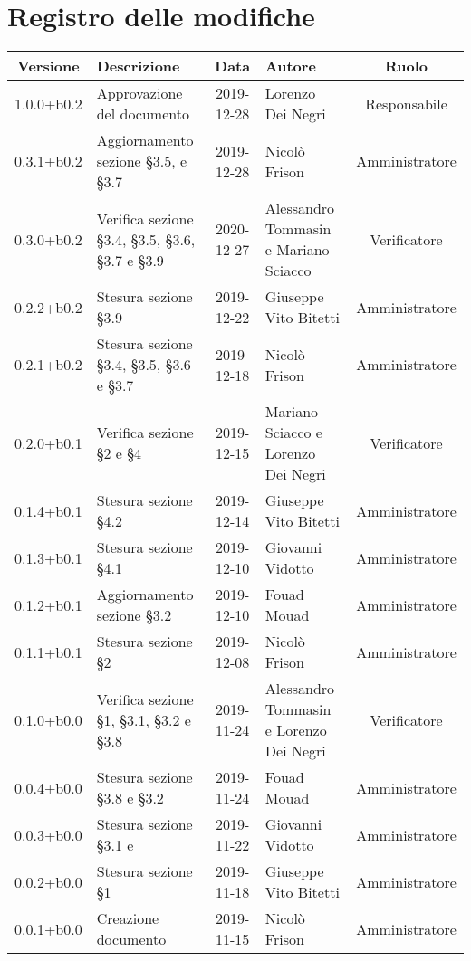 \section*{Registro delle modifiche}

\begin{center}
	\begin{longtable}{|c|p{3cm}|c|p{4cm}|c|}
	\hline
	\rowcolor{lighter-grayer}
	\textbf{Versione} & \textbf{Descrizione} & \textbf{Data} & \textbf{Autore} & \textbf{Ruolo} \\
	\hline
	\endfirsthead



	\hline
	1.0.0+b0.2 & Approvazione del documento & 2019-12-28 & Lorenzo Dei Negri & Responsabile \\
	\hline
	0.3.1+b0.2 & Aggiornamento sezione  \S3.5, e \S3.7 & 2019-12-28 & Nicolò Frison & Amministratore \\
	\hline 
	0.3.0+b0.2 & Verifica sezione \S3.4, \S3.5, \S3.6, \S3.7 e \S3.9 & 2020-12-27 & Alessandro Tommasin e Mariano Sciacco & Verificatore\\
	\hline
	0.2.2+b0.2 & Stesura sezione \S3.9 & 2019-12-22 & Giuseppe Vito Bitetti & Amministratore \\
	\hline
	0.2.1+b0.2 & Stesura sezione \S3.4, \S3.5, \S3.6 e \S3.7 & 2019-12-18 & Nicolò Frison & Amministratore \\
	\hline
	0.2.0+b0.1 & Verifica sezione \S2 e \S4 & 2019-12-15 & Mariano Sciacco e Lorenzo Dei Negri & Verificatore \\
	\hline
	0.1.4+b0.1 & Stesura sezione \S4.2 & 2019-12-14 & Giuseppe Vito Bitetti & Amministratore \\
	\hline
	0.1.3+b0.1 & Stesura sezione \S4.1 & 2019-12-10 & Giovanni Vidotto & Amministratore \\
	\hline
	0.1.2+b0.1 & Aggiornamento sezione \S3.2 & 2019-12-10 & Fouad Mouad & Amministratore \\
	\hline
	0.1.1+b0.1 & Stesura sezione \S2  & 2019-12-08 & Nicolò Frison & Amministratore \\
	\hline
	0.1.0+b0.0 & Verifica sezione \S1, \S3.1, \S3.2 e \S3.8 & 2019-11-24 & Alessandro Tommasin e Lorenzo Dei Negri & Verificatore \\
	\hline
	0.0.4+b0.0 & Stesura sezione \S3.8 e \S3.2 & 2019-11-24 & Fouad Mouad & Amministratore \\
	\hline
	0.0.3+b0.0 & Stesura sezione \S3.1 e & 2019-11-22 & Giovanni Vidotto & Amministratore \\
	\hline
	0.0.2+b0.0 & Stesura sezione \S1 & 2019-11-18 & Giuseppe Vito Bitetti & Amministratore \\
	\hline
	0.0.1+b0.0 & Creazione documento & 2019-11-15 & Nicolò Frison & Amministratore  \\
	\hline

	\end{longtable}
\end{center}
